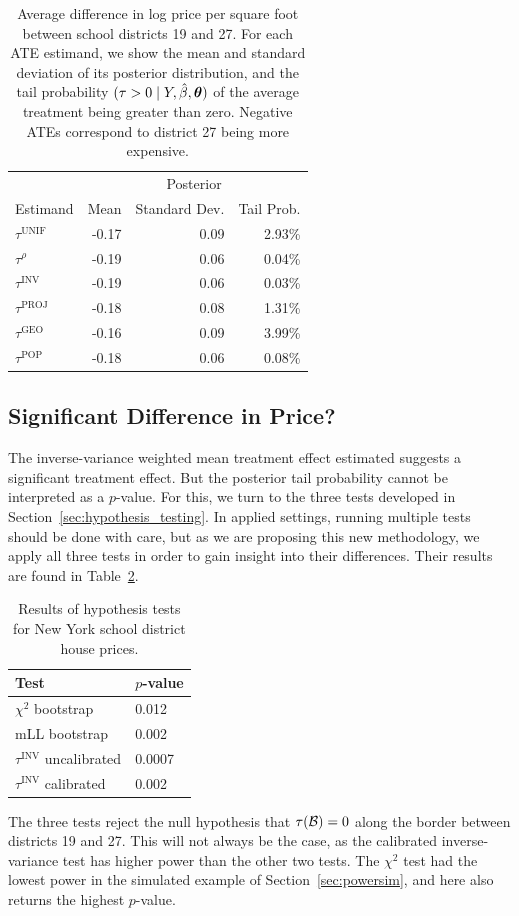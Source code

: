 \documentclass[letter]{article}
\DeclarePairedDelimiter{\parenthesis}{\lparen}{\rparen}
\newcommand{\del}[1]{\parenthesis*{#1}}
\let\Pr\relax
\DeclareMathOperator{\Pr}{\mathbb{P}}
\newcommand{\border}{\mathcal{B}}
\newcommand{\unifavg}{\tau^{\mathrm{UNIF}}}
\newcommand{\invvar}{\tau^{\mathrm{INV}}}
\newcommand{\taurho}{\tau^{\rho}}
\newcommand{\tauproj}{\tau^{\mathrm{PROJ}}}
\newcommand{\taugeo}{\tau^{\mathrm{GEO}}}
\newcommand{\taupop}{\tau^{\mathrm{POP}}}
\newcommand{\hyperparam}{\bm{\theta}}
\begin{document}
\begin{table}
\centering
\begin{tabular}{lrrr}
\hline
& \multicolumn{3}{c}{Posterior} \\
    Estimand & Mean & Standard Dev. & Tail Prob. \\
    \hline
$\unifavg$ & -0.17 & 0.09 & 2.93\% \\
$\taurho$  & -0.19 & 0.06 & 0.04\% \\
$\invvar$  & -0.19 & 0.06 & 0.03\% \\
$\tauproj$ & -0.18 & 0.08 & 1.31\% \\
$\taugeo$  & -0.16 & 0.09 & 3.99\% \\
$\taupop$  & -0.18 & 0.06 & 0.08\% \\
\hline
\end{tabular}
\label{table:NYC_ate}
\caption{Average difference in log price per square foot between school districts 19 and 27. For each ATE estimand, we show the mean and standard deviation of its posterior distribution, and the tail probability $\Pr(\tau > 0 \mid Y, \hat{\beta}, \hyperparam)$ of the average treatment being greater than zero. Negative ATEs correspond to district 27 being more expensive.}
\end{table}
    	\hypertarget{significant-difference-in-price}{%
\subsection{Significant Difference in Price?}\label{significant-difference-in-price}}

The inverse-variance weighted mean treatment effect estimated suggests a significant treatment effect.
But the posterior tail probability cannot be interpreted as a \(p\)-value.
For this, we turn to the three tests developed in Section~\ref{sec:hypothesis_testing}.
In applied settings, running multiple tests should be done with care,
but as we are proposing this new methodology,
we apply all three tests in order to gain insight into their differences.
Their results are found in Table~\ref{table:NYC_tests}.
    

\begin{table}[]
\centering
\label{table:NYC_tests}
\begin{tabular}{ll}
\hline
Test                   & $p$-value \\
\hline
$\chi^2$ bootstrap     & 0.012     \\
mLL bootstrap          & 0.002     \\
$\invvar$ uncalibrated & 0.0007    \\
$\invvar$ calibrated   & 0.002    
\end{tabular}
\caption{Results of hypothesis tests for New York school district house prices.}
\end{table}
    	The three tests reject the null hypothesis that \(\tau\del{\border}=0\) along the border between districts 19 and 27.
This will not always be the case, as the calibrated inverse-variance test has higher power than the other two tests.
The \(\chi^2\) test had the lowest power in the simulated example of Section~\ref{sec:powersim}, and here also returns the highest \(p\)-value.
    
\end{document}
